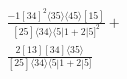 \documentclass[varwidth, border=5pt]{standalone}
\begin{document}
\begin{my}
$\begin{gathered}
\scriptscriptstyle\frac{-1[34]^2⟨35⟩⟨45⟩[15]}{[25]⟨34⟩⟨5|1+2|5]^2}+\\
\scriptscriptstyle\frac{2[13][34]⟨35⟩}{[25]⟨34⟩⟨5|1+2|5]}\phantom{+}
\end{gathered}$
\end{my}
\end{document}
